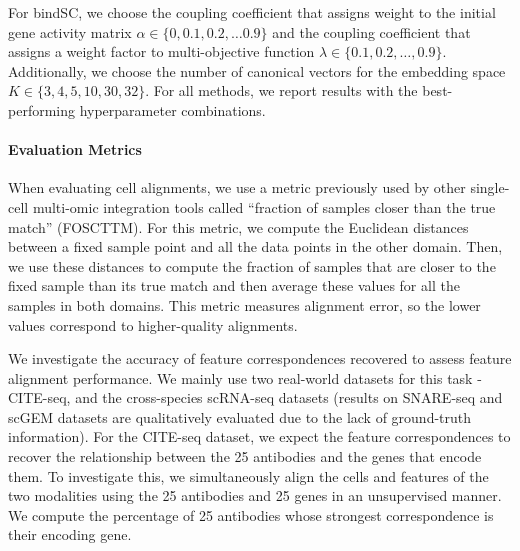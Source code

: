 For bindSC, we choose the coupling coefficient that assigns weight to the
initial gene activity matrix $\alpha \in \{0, 0.1, 0.2, \dots 0.9\}$ and
the coupling coefficient that assigns a weight factor to multi-objective function
$\lambda \in \{0.1, 0.2, \dots, 0.9\}$. Additionally, we choose the number of canonical vectors
for the embedding space $K \in \{3, 4, 5, 10, 30, 32\}$.  For all methods,
we report results with the best-performing hyperparameter combinations.

\paragraph{Evaluation Metrics} When evaluating cell alignments, we use a metric previously used
by other single-cell multi-omic integration tools
\citep{liu_et_al:LIPIcs:2019:11040,singh20,cao2020unsupervised,Demetci20,Pamona,Demetci22,bindSC}
called ``fraction of samples closer than the true match'' (FOSCTTM). For this metric,
we compute the Euclidean distances between a fixed sample point and all the data points
in the other domain. Then, we use these distances to compute the fraction of samples
that are closer to the fixed sample than its true match and then average these values
for all the samples in both domains. This metric measures alignment error, so the lower values
correspond to higher-quality alignments.

We investigate the accuracy of feature correspondences recovered to assess feature alignment
performance. We mainly use two real-world datasets for this task - CITE-seq,
and the cross-species scRNA-seq datasets (results on SNARE-seq and scGEM datasets
are qualitatively evaluated due to the lack of ground-truth information). For the CITE-seq dataset,
we expect the feature correspondences to recover the relationship between the 25 antibodies
and the genes that encode them. To investigate this, we simultaneously align the cells and
features of the two modalities using the 25 antibodies and 25 genes in an unsupervised manner.
We compute the percentage of 25 antibodies whose strongest correspondence is their encoding gene.

